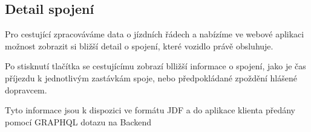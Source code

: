 \subsection{Detail spojení}
Pro cestující zpracováváme data o jízdních řádech a nabízíme ve webové aplikaci možnost zobrazit si bližší detail o spojení, které vozidlo právě obsluhuje.

Po stisknutí tlačítka se cestujícímu zobrazí blližší informace o spojení, jako je čas příjezdu k jednotlivým zastávkám spoje, nebo předpokládané zpoždění hlášené dopravcem.

Tyto informace jsou k dispozici ve formátu JDF a do aplikace klienta předány pomocí GRAPHQL dotazu na Backend